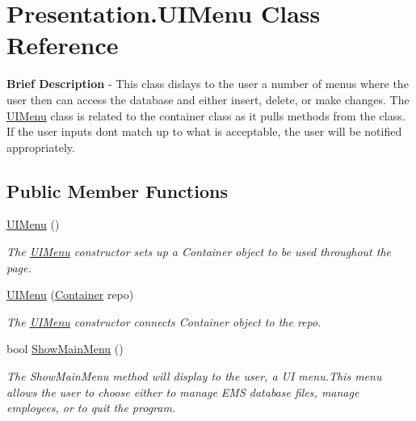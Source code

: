\hypertarget{class_presentation_1_1_u_i_menu}{}\section{Presentation.\+U\+I\+Menu Class Reference}
\label{class_presentation_1_1_u_i_menu}


{\bfseries Brief Description} -\/ This class dislays to the user a number of menus where the user then can access the database and either insert, delete, or make changes. The \hyperlink{class_presentation_1_1_u_i_menu}{U\+I\+Menu} class is related to the container class as it pulls methods from the class. If the user inputs don\textquotesingle{}t match up to what is acceptable, the user will be notified appropriately.  


\subsection*{Public Member Functions}
\begin{DoxyCompactItemize}
\item 
\hyperlink{class_presentation_1_1_u_i_menu_aecce7fd9ed4696929cbcada2da8c4c2c}{U\+I\+Menu} ()
\begin{DoxyCompactList}\small\item\em The \hyperlink{class_presentation_1_1_u_i_menu}{U\+I\+Menu} constructor sets up a Container object to be used throughout the page. \end{DoxyCompactList}\item 
\hyperlink{class_presentation_1_1_u_i_menu_ac27724c06cbdcddbcf940f812ba307e3}{U\+I\+Menu} (\hyperlink{class_the_company_1_1_container}{Container} repo)
\begin{DoxyCompactList}\small\item\em The \hyperlink{class_presentation_1_1_u_i_menu}{U\+I\+Menu} constructor connects Container object to the repo. \end{DoxyCompactList}\item 
bool \hyperlink{class_presentation_1_1_u_i_menu_aa358c475a580c724b992458425649ada}{Show\+Main\+Menu} ()
\begin{DoxyCompactList}\small\item\em The Show\+Main\+Menu method will display to the user, a U\+I menu.\+This menu allows the user to choose either to manage E\+M\+S database files, manage employees, or to quit the program. \end{DoxyCompactList}\end{DoxyCompactItemize}
